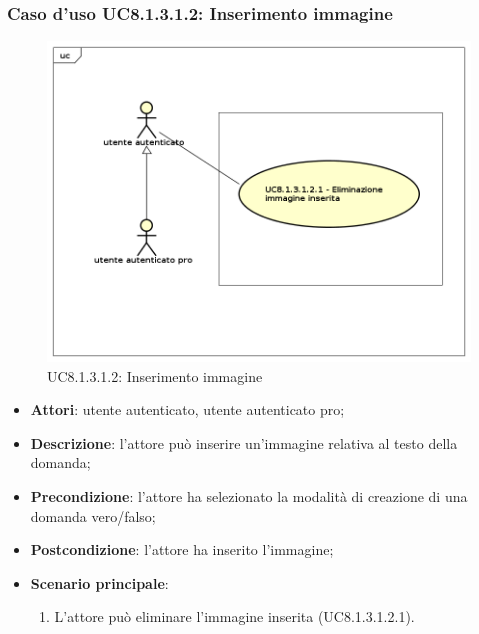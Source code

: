 \subsubsection{Caso d'uso UC8.1.3.1.2: Inserimento immagine}
	\label{UC8.1.3.1.2}
	\begin{figure}[h]
		\centering
			\includegraphics[scale=0.45,keepaspectratio]{UML/UC8_1_3_1_2.png}
		\caption{UC8.1.3.1.2: Inserimento immagine}
	\end{figure}
	\FloatBarrier
	\begin{itemize}
		\item
			\textbf{Attori}: utente autenticato, utente autenticato pro;
		\item		
			\textbf{Descrizione}: l'attore può inserire un'immagine relativa al testo della domanda;
		\item
			\textbf{Precondizione}: l'attore ha selezionato la modalità di creazione di una domanda vero/falso; 
		\item
			\textbf{Postcondizione}: l'attore ha inserito l'immagine;
		\item
			\textbf{Scenario principale}: 
			\begin{enumerate}
				\item
					L'attore può eliminare l'immagine inserita (UC8.1.3.1.2.1).	
			\end{enumerate}						
	\end{itemize}
